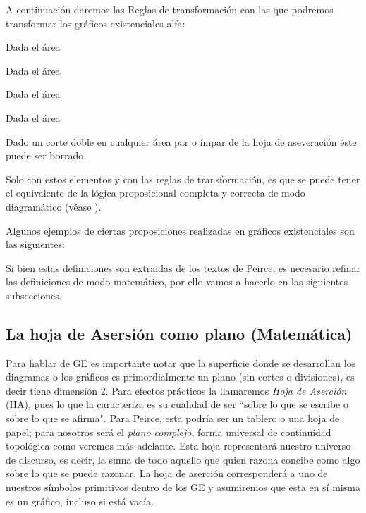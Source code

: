 \documentclass[
	fontsize=10pt, %
	twoside=false, %
	secnumdepth=1, %
	abstract=true, %
]{kaohandt}
\begin{document}
A continuación daremos las Reglas de transformación con las que podremos transformar los gráficos existenciales alfa:

\begin{definition}
	Dada el área
\end{definition}

\begin{definition}
	Dada el área
\end{definition}

\begin{definition}
	Dada el área
\end{definition}

\begin{definition}
	Dada el área
\end{definition}

\begin{definition}
	Dado un corte doble en cualquier área par o impar de la hoja de aseveración éste puede ser borrado.
\end{definition}

Solo con estos elementos y con las reglas de transformación, es que se puede tener el equivalente de la lógica proposicional completa y correcta de modo diagramático (véase ).

Algunos ejemplos de ciertas proposiciones realizadas en gráficos existenciales son las siguientes:



Si bien estas definiciones son extraidas de los textos de Peirce, es necesario refinar las definiciones de modo matemático, por ello vamos a hacerlo en las siguientes subsecciones.
\subsection{La hoja de Asersión como plano (Matemática)}

Para hablar de GE es importante notar que la superficie donde se desarrollan los diagramas o los gráficos es primordialmente un plano (sin cortes o divisiones), es decir tiene dimensión 2. Para efectos prácticos la llamaremos \textit{Hoja de Aserción} (HA), pues lo que la caracteriza es su cualidad de ser ``sobre lo que se escribe o sobre lo que se afirma". Para Peirce, esta podría ser un tablero o una hoja de papel; para nosotros será el \emph{plano complejo}, forma universal de continuidad topológica como veremos más adelante. Esta hoja representará nuestro universo de discurso, es decir, la suma de todo aquello que quien razona concibe como algo sobre lo que se puede razonar. La hoja de aserción corresponderá a uno de nuestros símbolos primitivos dentro de los GE y asumiremos que esta en sí misma es un gráfico, incluso si está vacía. 
\end{document}
